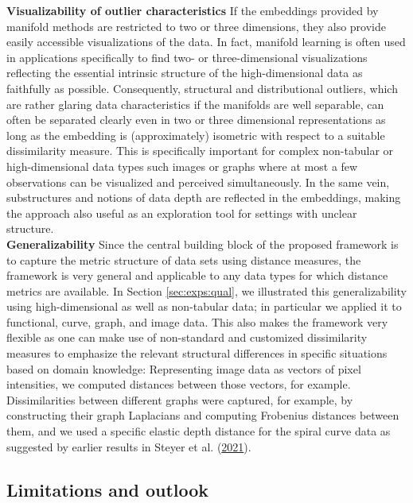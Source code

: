 \documentclass[
  10pt]{article}
\begin{document}
\textbf{Visualizability of outlier characteristics} If the embeddings provided by manifold methods are restricted to two or three dimensions, they also provide easily accessible visualizations of the data. In fact, manifold learning is often used in applications specifically to find two- or three-dimensional visualizations reflecting the essential intrinsic structure of the high-dimensional data as faithfully as possible. Consequently, structural and distributional outliers, which are rather glaring data characteristics if the manifolds are well separable, can often be separated clearly even in two or three dimensional representations as long as the embedding is (approximately) isometric with respect to a suitable dissimilarity measure. This is specifically important for complex non-tabular or high-dimensional data types such images or graphs where at most a few observations can be visualized and perceived simultaneously. In the same vein, substructures and notions of data depth are reflected in the embeddings, making the approach also useful as an exploration tool for settings with unclear structure.\\
\textbf{Generalizability} Since the central building block of the proposed framework is to capture the metric structure of data sets using distance measures, the framework is very general and applicable to any data types for which distance metrics are available. In Section \ref{sec:exps:qual}, we illustrated this generalizability using high-dimensional as well as non-tabular data; in particular we applied it to functional, curve, graph, and image data. This also makes the framework very flexible as one can make use of non-standard and customized dissimilarity measures to emphasize the relevant structural differences in specific situations based on domain knowledge: Representing image data as vectors of pixel intensities, we computed distances between those vectors, for example. Dissimilarities between different graphs were captured, for example, by constructing their graph Laplacians and computing Frobenius distances between them, and we used a specific elastic depth distance for the spiral curve data as suggested by earlier results in Steyer et al. (\protect\hyperlink{ref-steyer2021elastic}{2021}).

\hypertarget{sec:discussion:limitations}{%
\subsection{Limitations and outlook}\label{sec:discussion:limitations}}
\end{document}
